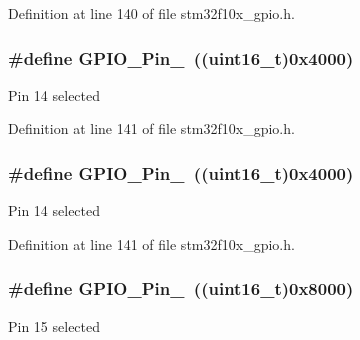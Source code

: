 Definition at line 140 of file stm32f10x\+\_\+gpio.\+h.

\subsubsection[{\texorpdfstring{G\+P\+I\+O\+\_\+\+Pin\+\_\+14}{GPIO_Pin_14}}]{\setlength{\rightskip}{0pt plus 5cm}\#define G\+P\+I\+O\+\_\+\+Pin\+\_~(({\bf uint16\+\_\+t})0x4000)}\hypertarget{group___g_p_i_o__pins__define_ga21cd1d89c0c061a6f09c5a842610bee5}{}\label{group___g_p_i_o__pins__define_ga21cd1d89c0c061a6f09c5a842610bee5}
Pin 14 selected 

Definition at line 141 of file stm32f10x\+\_\+gpio.\+h.

\subsubsection[{\texorpdfstring{G\+P\+I\+O\+\_\+\+Pin\+\_\+14}{GPIO_Pin_14}}]{\setlength{\rightskip}{0pt plus 5cm}\#define G\+P\+I\+O\+\_\+\+Pin\+\_~(({\bf uint16\+\_\+t})0x4000)}\hypertarget{group___g_p_i_o__pins__define_ga21cd1d89c0c061a6f09c5a842610bee5}{}\label{group___g_p_i_o__pins__define_ga21cd1d89c0c061a6f09c5a842610bee5}
Pin 14 selected 

Definition at line 141 of file stm32f10x\+\_\+gpio.\+h.

\subsubsection[{\texorpdfstring{G\+P\+I\+O\+\_\+\+Pin\+\_\+15}{GPIO_Pin_15}}]{\setlength{\rightskip}{0pt plus 5cm}\#define G\+P\+I\+O\+\_\+\+Pin\+\_~(({\bf uint16\+\_\+t})0x8000)}\hypertarget{group___g_p_i_o__pins__define_gae686a9fc47cf3e420e5db0784210711d}{}\label{group___g_p_i_o__pins__define_gae686a9fc47cf3e420e5db0784210711d}
Pin 15 selected 

